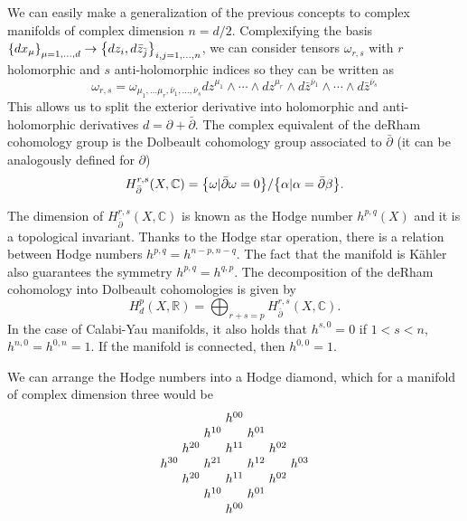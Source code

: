 We can easily make a generalization of the previous concepts to complex manifolds of complex dimension $n=d/2$.
Complexifying the basis $\qty{dx_{\mu}}_{\mu=1,\ldots,d} \to  \qty{dz_i,d\bar z_{\bar j}}_{i,j=1,\ldots,n}$,
we can consider tensors $\omega_{r,s}$ with $r$ holomorphic and $s$ anti-holomorphic indices so they can be written as 
\begin{equation}
  \omega_{r,s} = \omega_{\mu_1,\ldots\mu_r,\bar \nu_1,\ldots,\bar \nu_s} dz^{\mu_1}\wedge\cdots\wedge dz^{\mu_r}\wedge d\bar z^{\bar \nu_1}\wedge
  \cdots\wedge d\bar z^{\bar \nu_s}
\end{equation}
This allows us to split the exterior derivative into holomorphic and anti-holomorphic derivatives $d=\partial+\bar\partial$. 
The complex equivalent of the deRham cohomology group is the Dolbeault cohomology group associated to $\bar \partial$ (it can be analogously defined for $\partial$)
\begin{equation}
  H^{r,s}_{\bar \partial }(X,\mathbb C)=\qty {\omega | \bar \partial \omega= 0}/\qty{\alpha|\alpha=\bar\partial \beta}.
\end{equation}

The dimension of $H^{r,s}_{\bar \partial }(X,\mathbb C)$ is known as the Hodge number $h^{p,q}(X)$ and it is a topological invariant.
Thanks to the Hodge star operation, there is a relation between Hodge numbers $h^{p,q}=h^{n-p,n-q}$.
The fact that the manifold is Kähler also guarantees the symmetry $h^{p,q}=h^{q,p}$.
The decomposition of the deRham cohomology into Dolbeault cohomologies is given by
\begin{equation}
  H_d^p(X,\mathbb R)=\bigoplus_{r+s=p} H_{\bar \partial}^{r,s}(X,\mathbb C).
\end{equation}
In the case of Calabi-Yau manifolds, it also holds that $h^{s,0}=0$ if $1<s<n$, $h^{n,0}=h^{0,n}=1$.
If the manifold is connected, then $h^{0,0}=1$.

We can arrange the Hodge numbers into a Hodge diamond, which for a manifold of complex dimension
three would be
{\small \[
\arraycolsep=1.5pt
\begin{array}{ccccccc}
  &&&h^{00}&&&\\
 &&h^{10}&&h^{01}&&\\
 &h^{20}&&h^{11}&&h^{02}&\\
 h^{30}&&h^{21}&&h^{12}&&h^{03}\\
 &h^{20}&&h^{11}&&h^{02}&\\
 &&h^{10}&&h^{01}&&\\
  &&&h^{00}&&&
\end{array}
\]}

